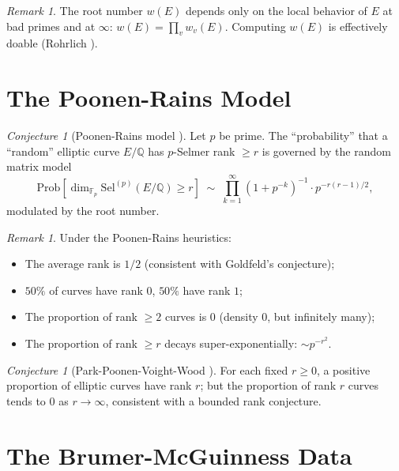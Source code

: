 \documentclass[12pt,a4paper]{amsart}
\theoremstyle{definition}
\theoremstyle{remark}
\newtheorem{remark}[theorem]{Remark}
\newtheorem{conjecture}[theorem]{Conjecture}
\newcommand{\Q}{\mathbb{Q}}
\newcommand{\F}{\mathbb{F}}
\newcommand{\Sel}{\mathrm{Sel}}
\newcommand{\Prob}{\mathrm{Prob}}
\begin{document}
\begin{remark}
  The root number $w(E)$ depends only on the local behavior of $E$ at bad primes and at
  $\infty$: $w(E) = \prod_v w_v(E)$. Computing $w(E)$ is effectively doable
  (Rohrlich \cite{Rohrlich1993}).
\end{remark}

\section{The Poonen-Rains Model}\label{sec:poonen_rains}

\begin{conjecture}[Poonen-Rains model \cite{PR2012}]\label{conj:pr}
  Let $p$ be prime. The ``probability'' that a ``random'' elliptic curve $E/\Q$ has
  $p$-Selmer rank $\geq r$ is governed by the random matrix model
  \[
    \Prob[\dim_{\F_p} \Sel^{(p)}(E/\Q) \geq r] \;\sim\;
    \prod_{k=1}^\infty (1 + p^{-k})^{-1} \cdot p^{-r(r-1)/2},
  \]
  modulated by the root number.
\end{conjecture}

\begin{remark}
  Under the Poonen-Rains heuristics:
  \begin{itemize}
    \item The average rank is $1/2$ (consistent with Goldfeld's conjecture);
    \item $50\%$ of curves have rank $0$, $50\%$ have rank $1$;
    \item The proportion of rank $\geq 2$ curves is $0$ (density $0$, but infinitely many);
    \item The proportion of rank $\geq r$ decays super-exponentially: $\sim p^{-r^2}$.
  \end{itemize}
\end{remark}

\begin{conjecture}[Park-Poonen-Voight-Wood \cite{PPVW2019}]
  For each fixed $r \geq 0$, a positive proportion of elliptic curves have rank $r$;
  but the proportion of rank $r$ curves tends to $0$ as $r \to \infty$, consistent
  with a bounded rank conjecture.
\end{conjecture}

\section{The Brumer-McGuinness Data}\label{sec:data}
\end{document}
